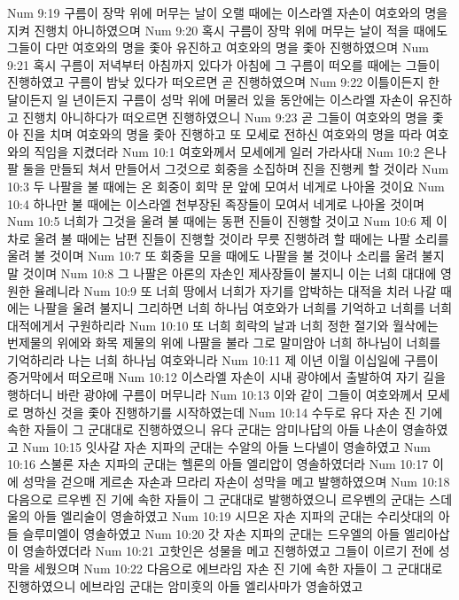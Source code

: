 Num 9:19  구름이 장막 위에 머무는 날이 오랠 때에는 이스라엘 자손이 여호와의 명을 지켜 진행치 아니하였으며
Num 9:20  혹시 구름이 장막 위에 머무는 날이 적을 때에도 그들이 다만 여호와의 명을 좇아 유진하고 여호와의 명을 좇아 진행하였으며
Num 9:21  혹시 구름이 저녁부터 아침까지 있다가 아침에 그 구름이 떠오를 때에는 그들이 진행하였고 구름이 밤낮 있다가 떠오르면 곧 진행하였으며
Num 9:22  이틀이든지 한 달이든지 일 년이든지 구름이 성막 위에 머물러 있을 동안에는 이스라엘 자손이 유진하고 진행치 아니하다가 떠오르면 진행하였으니
Num 9:23  곧 그들이 여호와의 명을 좇아 진을 치며 여호와의 명을 좇아 진행하고 또 모세로 전하신 여호와의 명을 따라 여호와의 직임을 지켰더라
Num 10:1  여호와께서 모세에게 일러 가라사대
Num 10:2  은나팔 둘을 만들되 쳐서 만들어서 그것으로 회중을 소집하며 진을 진행케 할 것이라
Num 10:3  두 나팔을 불 때에는 온 회중이 회막 문 앞에 모여서 네게로 나아올 것이요
Num 10:4  하나만 불 때에는 이스라엘 천부장된 족장들이 모여서 네게로 나아올 것이며
Num 10:5  너희가 그것을 울려 불 때에는 동편 진들이 진행할 것이고
Num 10:6  제 이 차로 울려 불 때에는 남편 진들이 진행할 것이라 무릇 진행하려 할 때에는 나팔 소리를 울려 불 것이며
Num 10:7  또 회중을 모을 때에도 나팔을 불 것이나 소리를 울려 불지 말 것이며
Num 10:8  그 나팔은 아론의 자손인 제사장들이 불지니 이는 너희 대대에 영원한 율례니라
Num 10:9  또 너희 땅에서 너희가 자기를 압박하는 대적을 치러 나갈 때에는 나팔을 울려 불지니 그리하면 너희 하나님 여호와가 너희를 기억하고 너희를 너희 대적에게서 구원하리라
Num 10:10  또 너희 희락의 날과 너희 정한 절기와 월삭에는 번제물의 위에와 화목 제물의 위에 나팔을 불라 그로 말미암아 너희 하나님이 너희를 기억하리라 나는 너희 하나님 여호와니라
Num 10:11  제 이년 이월 이십일에 구름이 증거막에서 떠오르매
Num 10:12  이스라엘 자손이 시내 광야에서 출발하여 자기 길을 행하더니 바란 광야에 구름이 머무니라
Num 10:13  이와 같이 그들이 여호와께서 모세로 명하신 것을 좇아 진행하기를 시작하였는데
Num 10:14  수두로 유다 자손 진 기에 속한 자들이 그 군대대로 진행하였으니 유다 군대는 암미나답의 아들 나손이 영솔하였고
Num 10:15  잇사갈 자손 지파의 군대는 수알의 아들 느다넬이 영솔하였고
Num 10:16  스불론 자손 지파의 군대는 헬론의 아들 엘리압이 영솔하였더라
Num 10:17  이에 성막을 걷으매 게르손 자손과 므라리 자손이 성막을 메고 발행하였으며
Num 10:18  다음으로 르우벤 진 기에 속한 자들이 그 군대대로 발행하였으니 르우벤의 군대는 스데울의 아들 엘리술이 영솔하였고
Num 10:19  시므온 자손 지파의 군대는 수리삿대의 아들 슬루미엘이 영솔하였고
Num 10:20  갓 자손 지파의 군대는 드우엘의 아들 엘리아삽이 영솔하였더라
Num 10:21  고핫인은 성물을 메고 진행하였고 그들이 이르기 전에 성막을 세웠으며
Num 10:22  다음으로 에브라임 자손 진 기에 속한 자들이 그 군대대로 진행하였으니 에브라임 군대는 암미훗의 아들 엘리사마가 영솔하였고
